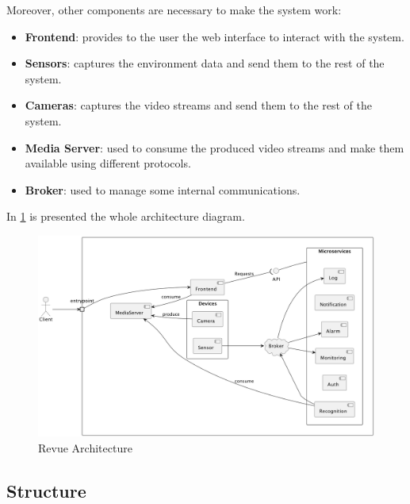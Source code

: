 \documentclass{scrartcl}
\begin{document}
    Moreover, other components are necessary to make the system work:

    \begin{itemize}
        \item \textbf{Frontend}: provides to the user the web interface to interact with the system.
        \item \textbf{Sensors}: captures the environment data and send them to the rest of the system.
        \item \textbf{Cameras}: captures the video streams and send them to the rest of the system.
        \item \textbf{Media Server}: used to consume the produced video streams and make them available using different protocols.
        \item \textbf{Broker}: used to manage some internal communications.
    \end{itemize}

    In \cref{fig:architecture} is presented the whole architecture diagram.

    \begin{figure}
        \centering
        \includegraphics[scale=0.51]{img/architecture}
        \caption{Revue Architecture}
        \label{fig:architecture}
    \end{figure}


    \subsection{Structure}

%
\end{document}
